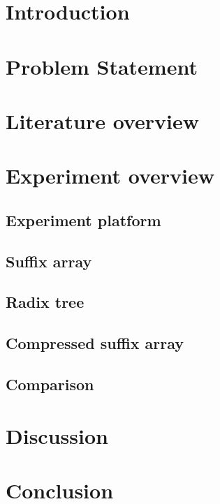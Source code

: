 \newpage
\tableofcontents
\newpage

\section{Introduction}


\newpage
\section{Problem Statement}


\newpage
\section{Literature overview}


\newpage
\section{Experiment overview}


\newpage
\subsection{Experiment platform}


\newpage
\subsection{Suffix array}


\newpage
\subsection{Radix tree}


\newpage
\subsection{Compressed suffix array}


\newpage
\subsection{Comparison}


\newpage
\section{Discussion}


\newpage
\section{Conclusion}


\newpage


